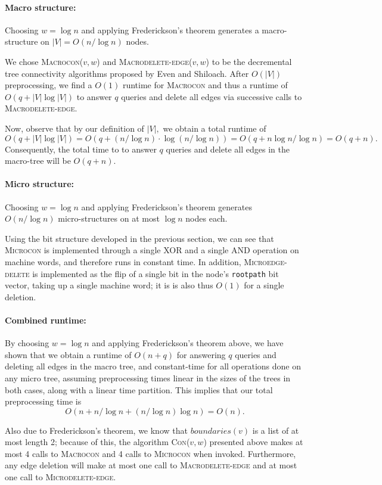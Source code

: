 \documentclass{article}
\begin{document}
\paragraph{Macro structure:}
Choosing $w=\log n$ and applying Frederickson's theorem generates  a macro-structure on $|V| = O(n/\log n)$ nodes. 

We chose \textsc{Macrocon}($v,w$) and \textsc{Macrodelete-edge}($v,w$) to be the decremental tree connectivity algorithms proposed by Even and Shiloach. After $O(|V|)$ preprocessing, we find a $O(1)$ runtime for \textsc{Macrocon} and thus a runtime of $O(q+|V|\log|V|)$ to answer $q$ queries and delete all edges via successive calls to \textsc{Macrodelete-edge}. 

Now, observe that by our definition of $|V|,$ we obtain a total runtime of $$O(q+|V|\log|V|) = O(q+(n/\log n)\cdot \log(n/\log n)) = O(q+n\log n/\log n)=O(q+n).$$ Consequently, the total time to to answer $q$ queries and delete all edges in the macro-tree will be $O(q+n).$

\paragraph{Micro structure:}
Choosing $w=\log n$ and applying Frederickson's theorem generates $O(n/\log n)$ micro-structures on at most $\log n$ nodes each.

Using the bit structure developed in the previous section, we can see that \textsc{Microcon} is implemented through a single XOR and a single AND operation on machine words, and therefore runs in constant time. In addition, \textsc{Microedge-delete} is implemented as the flip of a single bit in the node's \texttt{rootpath} bit vector, taking up a single machine word; it is is also thus $O(1)$ for a single deletion.

\paragraph{Combined runtime:}
By choosing $w=\log n$ and applying Frederickson's theorem above, we have shown that we obtain a runtime of $O(n+q)$ for answering $q$ queries and deleting all edges in the macro tree, and constant-time for all operations done on any micro tree, assuming preprocessing times linear in the sizes of the trees in both cases, along with a linear time partition. This implies that our total preprocessing time is $$O(n + n/\log n + (n/\log n)\log n)=O(n).$$

Also due to Frederickson's theorem, we know that $boundaries(v)$ is a list of at most length 2; because of this, the algorithm \textsc{Con}($v,w$) presented above makes at most 4 calls to \textsc{Macrocon} and 4 calls to \textsc{Microcon} when invoked. Furthermore, any edge deletion will make at most one call to \textsc{Macrodelete-edge} and at most one call to \textsc{Microdelete-edge}.
\end{document}

